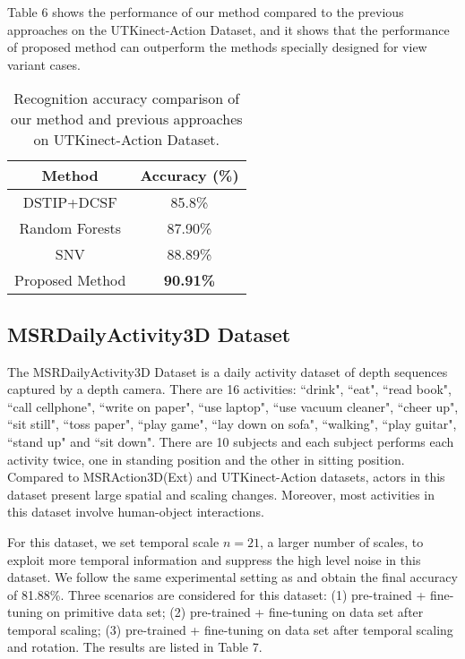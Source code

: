 \documentclass[conference]{IEEEtran}
\begin{document}
Table 6 shows the performance of our method compared to the previous approaches on the UTKinect-Action Dataset, and it shows that the performance of proposed method can outperform the methods specially designed for view variant cases.

\begin{table}[h]
\centering
\caption{Recognition accuracy comparison of our method and previous approaches on  UTKinect-Action Dataset.}
\begin{tabular}{|c|c|}
\hline
Method & Accuracy (\%)\\
\hline
DSTIP+DCSF \cite{xia2013spatio} & 85.8\%  \\
\hline
Random Forests \cite{zhu2013fusing} & 87.90\%  \\
\hline
SNV \cite{yangsuper} & 88.89\%  \\
\hline
Proposed Method & \textbf{90.91\%}  \\
\hline
\end{tabular}
\end{table}





\subsection{MSRDailyActivity3D Dataset}
The MSRDailyActivity3D Dataset \cite{wang2012mining} is a daily activity dataset of depth sequences captured by a depth camera. There are 16 activities: ``drink", ``eat", ``read book", ``call cellphone", ``write on paper", ``use laptop", ``use vacuum cleaner", ``cheer up", ``sit still", ``toss paper", ``play game", ``lay down on sofa", ``walking", ``play guitar", ``stand up" and ``sit down". There are 10 subjects and each subject performs each activity twice, one in standing position and the other in sitting position. Compared to MSRAction3D(Ext) and UTKinect-Action datasets, actors in this dataset present large spatial and scaling changes. Moreover, most activities in this dataset involve human-object interactions.

For this dataset, we set temporal scale $n = 21$, a larger number of scales, to exploit more temporal information and suppress the high level noise in this dataset. We follow the same experimental setting as \cite{wang2012mining} and obtain the final accuracy of 81.88\%. Three scenarios are considered for this dataset: (1) pre-trained + fine-tuning on primitive data set; (2) pre-trained + fine-tuning on data set after temporal scaling; (3) pre-trained + fine-tuning on data set after temporal scaling and rotation. The results are listed in Table 7.
\end{document}
